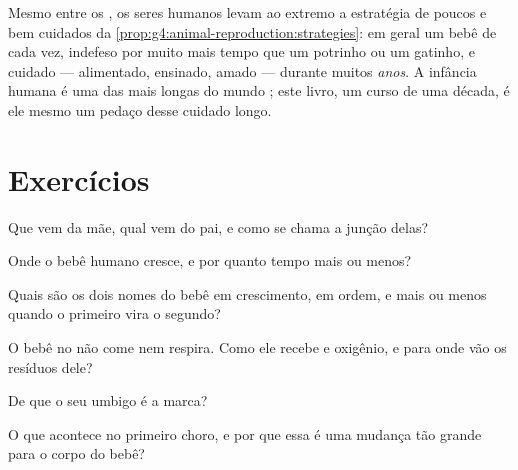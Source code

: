 \begin{example}\label{ex:g5:human-reproduction:longcare}
Mesmo entre os , os seres humanos levam ao extremo a
estratégia de poucos e bem cuidados da
\cref{prop:g4:animal-reproduction:strategies}: em geral um bebê de
cada vez, indefeso por muito mais tempo que um potrinho ou um
gatinho, e cuidado --- alimentado, ensinado, amado --- durante muitos
\emph{anos}. A infância humana é uma das mais longas do mundo
; este livro, um curso de uma década, é ele mesmo um pedaço
desse cuidado longo.
\end{example}

\section{Exercícios}

\begin{exercise}[$\star$]\label{exo:g5:human-reproduction:1}
Que  vem da mãe, qual vem do pai, e como se chama a junção
delas?
\end{exercise}

\begin{exercise}[$\star$]\label{exo:g5:human-reproduction:2}
Onde o bebê humano cresce, e por quanto tempo mais ou menos?
\end{exercise}

\begin{exercise}[$\star$]\label{exo:g5:human-reproduction:3}
Quais são os dois nomes do bebê em crescimento, em ordem, e mais ou
menos quando o primeiro vira o segundo?
\end{exercise}

\begin{exercise}[$\star$]\label{exo:g5:human-reproduction:4}
O bebê no  não come nem respira. Como ele recebe  e
oxigênio, e para onde vão os resíduos dele?
\end{exercise}

\begin{exercise}[$\star$]\label{exo:g5:human-reproduction:5}
De que o seu umbigo é a marca?
\end{exercise}

\begin{exercise}[$\star$]\label{exo:g5:human-reproduction:6}
O que acontece no primeiro choro, e por que essa é uma mudança tão
grande para o corpo do bebê?
\end{exercise}


